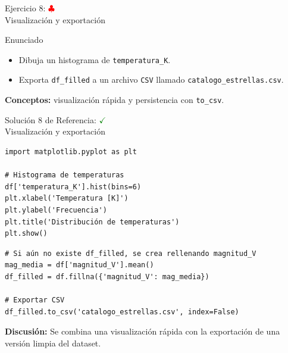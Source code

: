 \documentclass[10pt]{beamer}
\begin{document}
\begin{frame}{Ejercicio 8: \hfill \textcolor{red}{$\clubsuit$} \\ Visualización y exportación}
\begin{block}{Enunciado}
  \begin{itemize}
    \item Dibuja un histograma de \texttt{temperatura\_K}.
    \item Exporta \texttt{df\_filled} a un archivo \texttt{CSV} llamado \texttt{catalogo\_estrellas.csv}.
  \end{itemize}
\end{block}
\textbf{Conceptos:} visualización rápida y persistencia con \texttt{to\_csv}.
\end{frame}

\begin{solutionblock}
\begin{frame}[fragile]{Solución 8 de Referencia: \hfill \textcolor{green}{$\checkmark$} \\ Visualización y exportación}
\begin{verbatim}
import matplotlib.pyplot as plt

# Histograma de temperaturas
df['temperatura_K'].hist(bins=6)
plt.xlabel('Temperatura [K]')
plt.ylabel('Frecuencia')
plt.title('Distribución de temperaturas')
plt.show()
\end{verbatim}

\begin{verbatim}
# Si aún no existe df_filled, se crea rellenando magnitud_V
mag_media = df['magnitud_V'].mean()
df_filled = df.fillna({'magnitud_V': mag_media})

# Exportar CSV
df_filled.to_csv('catalogo_estrellas.csv', index=False)
\end{verbatim}
\textbf{Discusión:} Se combina una visualización rápida con la exportación de una versión limpia del dataset.
\end{frame}
\end{solutionblock}
\end{document}
